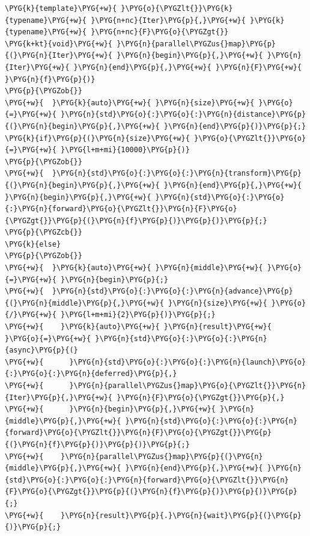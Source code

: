 \begin{codeblockbg}
\begin{Verbatim}[commandchars=\\\{\},breaklines=true,breakanywhere=true,fontsize=\codefont,xleftmargin=17bp]
\PYG{k}{template}\PYG{+w}{ }\PYG{o}{\PYGZlt{}}\PYG{k}{typename}\PYG{+w}{ }\PYG{n+nc}{Iter}\PYG{p}{,}\PYG{+w}{ }\PYG{k}{typename}\PYG{+w}{ }\PYG{n+nc}{F}\PYG{o}{\PYGZgt{}}
\PYG{k+kt}{void}\PYG{+w}{ }\PYG{n}{parallel\PYGZus{}map}\PYG{p}{(}\PYG{n}{Iter}\PYG{+w}{ }\PYG{n}{begin}\PYG{p}{,}\PYG{+w}{ }\PYG{n}{Iter}\PYG{+w}{ }\PYG{n}{end}\PYG{p}{,}\PYG{+w}{ }\PYG{n}{F}\PYG{+w}{ }\PYG{n}{f}\PYG{p}{)}
\PYG{p}{\PYGZob{}}
\PYG{+w}{  }\PYG{k}{auto}\PYG{+w}{ }\PYG{n}{size}\PYG{+w}{ }\PYG{o}{=}\PYG{+w}{ }\PYG{n}{std}\PYG{o}{:}\PYG{o}{:}\PYG{n}{distance}\PYG{p}{(}\PYG{n}{begin}\PYG{p}{,}\PYG{+w}{ }\PYG{n}{end}\PYG{p}{)}\PYG{p}{;}
\PYG{k}{if}\PYG{p}{(}\PYG{n}{size}\PYG{+w}{ }\PYG{o}{\PYGZlt{}}\PYG{o}{=}\PYG{+w}{ }\PYG{l+m+mi}{10000}\PYG{p}{)}
\PYG{p}{\PYGZob{}}
\PYG{+w}{  }\PYG{n}{std}\PYG{o}{:}\PYG{o}{:}\PYG{n}{transform}\PYG{p}{(}\PYG{n}{begin}\PYG{p}{,}\PYG{+w}{ }\PYG{n}{end}\PYG{p}{,}\PYG{+w}{ }\PYG{n}{begin}\PYG{p}{,}\PYG{+w}{ }\PYG{n}{std}\PYG{o}{:}\PYG{o}{:}\PYG{n}{forward}\PYG{o}{\PYGZlt{}}\PYG{n}{F}\PYG{o}{\PYGZgt{}}\PYG{p}{(}\PYG{n}{f}\PYG{p}{)}\PYG{p}{)}\PYG{p}{;}
\PYG{p}{\PYGZcb{}}
\PYG{k}{else}
\PYG{p}{\PYGZob{}}
\PYG{+w}{  }\PYG{k}{auto}\PYG{+w}{ }\PYG{n}{middle}\PYG{+w}{ }\PYG{o}{=}\PYG{+w}{ }\PYG{n}{begin}\PYG{p}{;}
\PYG{+w}{  }\PYG{n}{std}\PYG{o}{:}\PYG{o}{:}\PYG{n}{advance}\PYG{p}{(}\PYG{n}{middle}\PYG{p}{,}\PYG{+w}{ }\PYG{n}{size}\PYG{+w}{ }\PYG{o}{/}\PYG{+w}{ }\PYG{l+m+mi}{2}\PYG{p}{)}\PYG{p}{;}
\PYG{+w}{    }\PYG{k}{auto}\PYG{+w}{ }\PYG{n}{result}\PYG{+w}{ }\PYG{o}{=}\PYG{+w}{ }\PYG{n}{std}\PYG{o}{:}\PYG{o}{:}\PYG{n}{async}\PYG{p}{(}
\PYG{+w}{      }\PYG{n}{std}\PYG{o}{:}\PYG{o}{:}\PYG{n}{launch}\PYG{o}{:}\PYG{o}{:}\PYG{n}{deferred}\PYG{p}{,}
\PYG{+w}{      }\PYG{n}{parallel\PYGZus{}map}\PYG{o}{\PYGZlt{}}\PYG{n}{Iter}\PYG{p}{,}\PYG{+w}{ }\PYG{n}{F}\PYG{o}{\PYGZgt{}}\PYG{p}{,}
\PYG{+w}{      }\PYG{n}{begin}\PYG{p}{,}\PYG{+w}{ }\PYG{n}{middle}\PYG{p}{,}\PYG{+w}{ }\PYG{n}{std}\PYG{o}{:}\PYG{o}{:}\PYG{n}{forward}\PYG{o}{\PYGZlt{}}\PYG{n}{F}\PYG{o}{\PYGZgt{}}\PYG{p}{(}\PYG{n}{f}\PYG{p}{)}\PYG{p}{)}\PYG{p}{;}
\PYG{+w}{    }\PYG{n}{parallel\PYGZus{}map}\PYG{p}{(}\PYG{n}{middle}\PYG{p}{,}\PYG{+w}{ }\PYG{n}{end}\PYG{p}{,}\PYG{+w}{ }\PYG{n}{std}\PYG{o}{:}\PYG{o}{:}\PYG{n}{forward}\PYG{o}{\PYGZlt{}}\PYG{n}{F}\PYG{o}{\PYGZgt{}}\PYG{p}{(}\PYG{n}{f}\PYG{p}{)}\PYG{p}{)}\PYG{p}{;}
\PYG{+w}{    }\PYG{n}{result}\PYG{p}{.}\PYG{n}{wait}\PYG{p}{(}\PYG{p}{)}\PYG{p}{;}

\end{Verbatim}
\end{codeblockbg}
